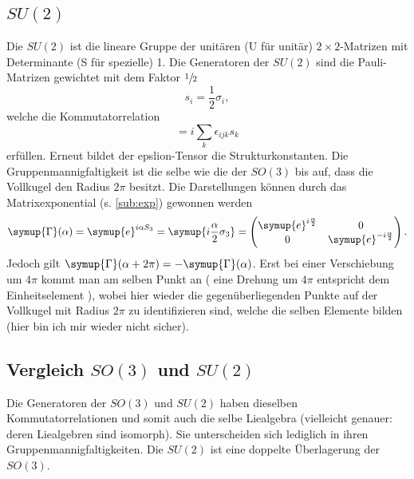 \documentclass[
  captions=tableheading,  %
  titlepage=firstiscover, %
]{scrartcl}
\begin{document}
\subsection{\texorpdfstring{$SU(2)$}{PDFstring}}
Die $SU(2)$ ist die lineare Gruppe der unitären (U für unitär) $2 \times 2$-Matrizen mit Determinante (S für spezielle) 1.
Die Generatoren der $SU(2)$ sind die Pauli-Matrizen gewichtet mit dem Faktor $\sfrac{1}{2}$
\begin{equation*}
  s_i = \frac{1}{2} \sigma_i,
\end{equation*}
welche die Kommutatorrelation 
\begin{equation*}
  [s_i, s_j] = i \sum_k \epsilon_{ijk} s_k
\end{equation*}
erfüllen.
Erneut bildet der epslion-Tensor die Strukturkonstanten.
Die Gruppenmannigfaltigkeit ist die selbe wie die der $SO(3)$ bis auf, dass die Vollkugel den Radius $2\pi$ besitzt.
Die Darstellungen können durch das Matrixexponential (s. \ref{sub:exp}) gewonnen werden
\begin{equation*}
  \symup{\Gamma}(\alpha) = \symup{e}^{i\alpha S_3} = \symup{i\frac{\alpha}{2}\sigma_3} = 
  \begin{pmatrix}
    \symup{e}^{i\frac{\alpha}{2}} & 0                               \\
    0                             & \symup{e}^{-i\frac{\alpha}{2}}  \\
  \end{pmatrix}.
\end{equation*}
Jedoch gilt $\symup{\Gamma}(\alpha + 2\pi) = - \symup{\Gamma}(\alpha)$.
Erst bei einer Verschiebung um $4\pi$ kommt man am selben Punkt an (
  eine Drehung um $4\pi$ entspricht dem Einheitselement
), wobei hier wieder die gegenüberliegenden Punkte auf der Vollkugel 
mit Radius $2\pi$ zu identifizieren sind, welche 
die selben Elemente bilden ({\color{red}hier bin ich mir wieder nicht sicher}).
\subsection{Vergleich \texorpdfstring{$SO(3)$}{PDFstring} und \texorpdfstring{$SU(2)$}{PDFstring}}
Die Generatoren der $SO(3)$ und $SU(2)$ haben dieselben Kommutatorrelationen und somit auch die selbe Liealgebra
(vielleicht genauer: deren Liealgebren sind isomorph). 
Sie unterscheiden sich lediglich in ihren Gruppenmannigfaltigkeiten.
Die $SU(2)$ ist eine doppelte Überlagerung der $SO(3)$.
\end{document}
